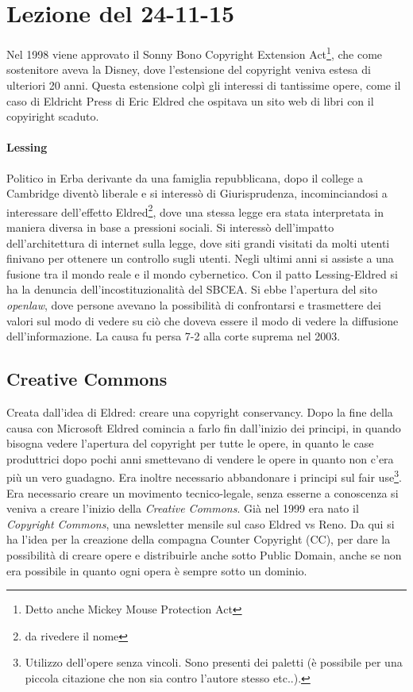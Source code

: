 \section{Lezione del 24-11-15}

Nel 1998 viene approvato il Sonny Bono Copyright Extension Act\footnote{Detto anche Mickey Mouse Protection Act}, che come sostenitore aveva la Disney, dove l'estensione del copyright veniva estesa di ulteriori 20 anni. Questa estensione colp\`i gli interessi di tantissime opere, come il caso di Eldricht Press di Eric Eldred che ospitava un sito web di libri con il copyiright scaduto.


\paragraph*{Lessing}Politico in Erba derivante da una famiglia repubblicana, dopo il college a Cambridge divent\`o liberale e si interess\`o di Giurisprudenza, incominciandosi a interessare dell'effetto Eldred\footnote{da rivedere il nome}, dove una stessa legge era stata interpretata in maniera diversa in base a pressioni sociali. Si interess\`o dell'impatto dell'architettura di internet sulla legge, dove siti grandi visitati da molti utenti finivano per ottenere un controllo sugli utenti.
Negli ultimi anni si assiste a una fusione tra il mondo reale e il mondo cybernetico.
Con il patto Lessing-Eldred si ha la denuncia dell'incostituzionalit\`a del SBCEA. Si ebbe l'apertura del sito \textit{openlaw}, dove persone avevano la possibilit\`a di confrontarsi e trasmettere dei valori sul modo di vedere su ci\`o che doveva essere il modo di vedere la diffusione dell'informazione. La causa fu persa 7-2 alla corte suprema nel 2003.

\subsection{Creative Commons}

Creata dall'idea di Eldred: creare una copyright conservancy. Dopo la fine della causa con Microsoft Eldred comincia a farlo fin dall'inizio dei principi, in quando bisogna vedere l'apertura del copyright per tutte le opere, in quanto le case produttrici dopo pochi anni smettevano di vendere le opere in quanto non c'era pi\`u un vero guadagno. Era inoltre necessario abbandonare i principi sul fair use\footnote{Utilizzo dell'opere senza vincoli. Sono presenti dei paletti (\`e possibile per una piccola citazione che non sia contro l'autore stesso etc..).}. Era necessario creare un movimento tecnico-legale, senza esserne a conoscenza si veniva a creare l'inizio della \textit{Creative Commons}. Gi\`a nel 1999 era nato il \textit{Copyright Commons}, una newsletter mensile sul caso Eldred vs Reno. Da qui si ha l'idea per la creazione della compagna Counter Copyright (CC), per dare la possibilit\`a di creare opere e distribuirle anche sotto Public Domain, anche se non era possibile in quanto ogni opera \`e sempre sotto un dominio.

